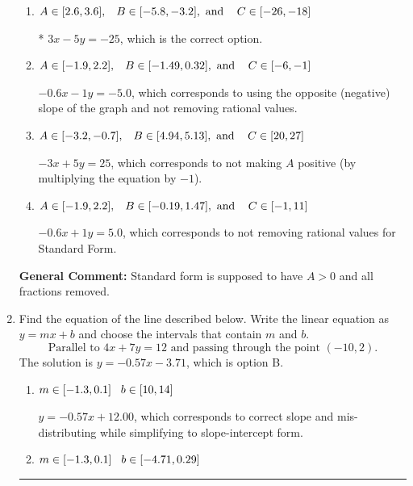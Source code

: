 \documentclass{extbook}[14pt]
\newcommand{\litem}[1]{\item #1

\rule{\textwidth}{0.4pt}}
\begin{document}
\begin{enumerate}
{\begin{enumerate}[label=\Alph*.]
 $3x + 5y = 25$, which corresponds to using the opposite (negative) slope of the graph, but did everything else correctly.
\item \( A \in [2.6, 3.6], \hspace{3mm} B \in [-5.8, -3.2], \text{ and } \hspace{3mm} C \in [-26, -18] \)

* $3x - 5y = -25$, which is the correct option.
\item \( A \in [-1.9, 2.2], \hspace{3mm} B \in [-1.49, 0.32], \text{ and } \hspace{3mm} C \in [-6, -1] \)

 $-0.6x - 1y = -5.0$, which corresponds to using the opposite (negative) slope of the graph and not removing rational values.
\item \( A \in [-3.2, -0.7], \hspace{3mm} B \in [4.94, 5.13], \text{ and } \hspace{3mm} C \in [20, 27] \)

 $-3x + 5y = 25$, which corresponds to not making $A$ positive (by multiplying the equation by $-1$).
\item \( A \in [-1.9, 2.2], \hspace{3mm} B \in [-0.19, 1.47], \text{ and } \hspace{3mm} C \in [-1, 11] \)

 $-0.6x + 1y = 5.0$, which corresponds to not removing rational values for Standard Form.
\end{enumerate}

\textbf{General Comment:} Standard form is supposed to have $A > 0$ and all fractions removed.
}
\litem{
Find the equation of the line described below. Write the linear equation as $ y=mx+b $ and choose the intervals that contain $m$ and $b$.
\[ \text{Parallel to } 4 x + 7 y = 12 \text{ and passing through the point } (-10, 2). \]
The solution is \( y = -0.57x - 3.71 \), which is option B.\begin{enumerate}[label=\Alph*.]
\item \( m \in [-1.3, 0.1] \hspace*{3mm} b \in [10, 14] \)

 $y = -0.57x + 12.00$, which corresponds to correct slope and mis-distributing while simplifying to slope-intercept form.
\item \( m \in [-1.3, 0.1] \hspace*{3mm} b \in [-4.71, 0.29] \)


\end{enumerate}}
\end{enumerate}
\end{document}
